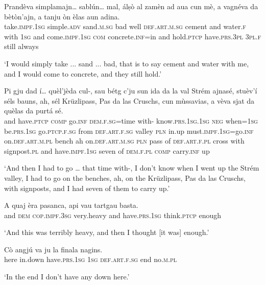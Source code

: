 \begin{linenumbers}
\gll  Prandèva simplamajn… sablún… mal, álṣò al zamèn ad aua cun mè, a vagnéva da bètòn’ajn, a tanju òn èlas aun adina.  \\
 take.\textsc{impf.1sg} simple.\textsc{adv} sand.\textsc{m.sg} bad well \textsc{def.art.m.sg} cement and water.\textsc{f} with \textsc{1sg} and  come.\textsc{impf.1sg} \textsc{com} concrete.\textsc{inf=}in  and hold.\textsc{ptcp} have.\textsc{prs.3pl} \textsc{3pl.f} still always \\
\end{linenumbers}
\medskip
\glt `I would simply take ... sand ... bad, that is to say cement and water with me, and I would come to concrete, and they still hold.'
\medskip

\begin{linenumbers}
\gll  Pi gju dad í… quèl’jèda cul-, sau bétg c’ju sun ida da la val Strém ajnasé, stuèv’í  séls bauns, ah, sél Krüzlipass, Pas da las Cruschs, cun mùssavias, a vèva sjat da quèlas da purtá sé.  \\
and have.\textsc{ptcp} \textsc{comp} go.\textsc{inf} \textsc{dem.f.sg=}time  with- know.\textsc{prs.1sg.1sg} \textsc{neg} when=\textsc{1sg} be.\textsc{prs.1sg} go.\textsc{ptcp.f.sg} from \textsc{def.art.f.sg} valley \textsc{pln} in.up must.\textsc{impf.1sg=}go.\textsc{inf} on.\textsc{def.art.m.pl} bench ah on.\textsc{def.art.m.sg} \textsc{pln} pass of  \textsc{def.art.f.pl} cross with signpost.\textsc{pl} and have.\textsc{impf.1sg} seven of  \textsc{dem.f.pl} \textsc{comp} carry.\textsc{inf} up \\
\end{linenumbers}
\medskip
\glt `And then I had to go … that time with-, I don’t know when I went up the Strém valley, I had to go on the benches, ah, on the Krüzlipass, Pas da las Cruschs, with signposts, and I had seven of them to carry up.'
\medskip

\begin{linenumbers}
\gll  A quaj èra pasanca, api vau tartgau basta.  \\
and \textsc{dem} \textsc{cop.impf.3sg} very.heavy and have.\textsc{prs.1sg} think.\textsc{ptcp} enough  \\
\end{linenumbers}
\medskip
\glt `And this was terribly heavy, and then I thought [it was] enough.'
\medskip

\begin{linenumbers}
\gll  Cò angjú va ju la finala nagins.  \\
here in.down have.\textsc{prs.1sg} \textsc{1sg} \textsc{def.art.f.sg} end no.\textsc{m.pl}  \\
\end{linenumbers}
\medskip
\glt `In the end I don’t have any down here.'
\medskip

